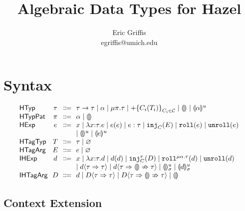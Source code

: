 \documentclass{article}
\title{Algebraic Data Types for Hazel}
\author{Eric Griffis \\ egriffis@umich.edu}
\date{}
\let\originalleft\left
\let\originalright\right
\renewcommand{\left}{\mathopen{}\mathclose\bgroup\originalleft}
\renewcommand{\right}{\aftergroup\egroup\originalright}
\newcommand\Sort[1]{\mathsf{#1}}
\newcommand\IHExp{\Sort{IHExp}}
\newcommand\IHTagArg{\Sort{IHTagArg}}
\newcommand\HExp{\Sort{HExp}}
\newcommand\HTagArg{\Sort{HTagArg}}
\newcommand\HTagTyp{\Sort{HTagTyp}}
\newcommand\HTagVar{\Sort{HTagVar}}
\newcommand\HTyp{\Sort{HTyp}}
\newcommand\HTypPat{\Sort{HTypPat}}
\newcommand\hole[2][]{\llparenthesis#1\rrparenthesis^{#2}}
\newcommand\Dhole[3][]{\llparenthesis#1\rrparenthesis_{#2}^{#3}}
\newcommand\Tarrow[2]{#1 \rightarrow #2}
\newcommand\Trec[2]{\mu{#1}.{#2}}
\newcommand\Tsum[1]{+\mathopen{}\left\{#1\right\}}
\newcommand\TagSet{\mathcal{C}}
\newcommand\Missing{\varnothing}
\newcommand\literal[1]{\mathtt{#1}}
\newcommand\asc[2]{{#1}:{#2}}
\newcommand\Efun[3]{\lambda{#1}{:}{#2}.{#3}}
\newcommand\Eapp[2]{{#1}\left({#2}\right)}
\newcommand\Einj[2]{\literal{inj}_{#1}\left({#2}\right)}
\newcommand\Ecase[2]{\literal{case} \left({#1}\right) \left\{{#2}\right\}}
\newcommand\Eroll[1]{\literal{roll}\left(#1\right)}
\newcommand\Eunroll[1]{\literal{unroll}\left(#1\right)}
\newcommand\Dfun[3]{\lambda{#1}{:}{#2}.{#3}}
\newcommand\Dapp[2]{{#1}\left({#2}\right)}
\newcommand\Dinj[3]{\literal{inj}_{#1}^{#2}\left({#3}\right)}
\newcommand\Dcase[2]{\literal{case} \left({#1}\right) \left\{{#2}\right\}}
\newcommand\Droll[3]{\literal{roll}^{\Trec{#1}{#2}}\left({#3}\right)}
\newcommand\Dunroll[1]{\literal{unroll}\left(#1\right)}
\newcommand\cast[3]{{#1}\langle{#2}\Rightarrow{#3}\rangle}
\newcommand\castfail[3]{{#1}\langle{#2}\Rightarrow{\llparenthesis\rrparenthesis}\nRightarrow{#3}\rangle}
\begin{document}
\maketitle


\section{Syntax}

\[
  \arraycolsep=0pt
  \begin{array}{l@{~~}c@{~~}c@{~~}l}
    \HTyp & \tau & \Coloneqq &
      \Tarrow{\tau}{\tau}
      \mid \alpha
      \mid \Trec{\pi}{\tau}
      \mid \Tsum{C_i(T_i)}_{C_i \in \TagSet}
      \mid \hole{}
      \mid \hole[\alpha]{u}
      \\
    \HTypPat & \pi & \Coloneqq & \alpha \mid \hole{} \\
    \HExp & e & \Coloneqq &
      x
      \mid \Efun{x}{\tau}{e}
      \mid \Eapp{e}{e}
      \mid \asc{e}{\tau}
      \mid \Einj{C}{E}
      \mid \Eroll{e}
      \mid \Eunroll{e}
      \\ & & &
      \mid \hole{u}
      \mid \hole[e]{u}
      \\
    \HTagTyp & T & \Coloneqq & \tau \mid \Missing \\
    \HTagArg & E & \Coloneqq & e \mid \Missing \\
    \IHExp & d & \Coloneqq &
      x
      \mid \Dfun{x}{\tau}{d}
      \mid \Dapp{d}{d}
      \mid \Dinj{C}{\tau}{D}
      \mid \Droll{\alpha}{\tau}{d}
      \mid \Dunroll{d}
      \\ & & &
      \mid \cast{d}{\tau}{\tau}
      \mid \castfail{d}{\tau}{\tau}
      \mid \Dhole{\sigma}{u}
      \mid \Dhole[d]{\sigma}{u}
      \\
    \IHTagArg & D & \Coloneqq &
      d
      \mid \cast{D}{\tau}{\tau}
      \mid \castfail{D}{\tau}{\tau}
      \mid \hole{}
      \\
  \end{array}
\]


\subsection{Context Extension}
\end{document}
